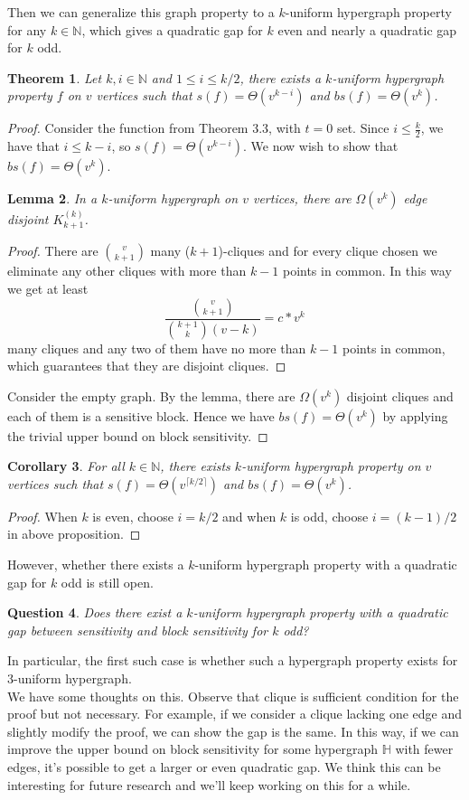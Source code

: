 \documentclass[psamsfonts]{amsart}
\newtheorem{theorem}{Theorem}[section]
\newtheorem{cor}[theorem]{Corollary}
\newtheorem{lem}[theorem]{Lemma}
\newtheorem{quest}[theorem]{Question}
\theoremstyle{definition}
\theoremstyle{remark}
\numberwithin{equation}{section}
\begin{document}
	Then we can generalize this graph property to a $k$-uniform hypergraph property for any $k \in \mathbb{N}$, which gives a quadratic gap for $k$ even and nearly a quadratic gap for $k$ odd.
	\begin{theorem}
		Let $k,i \in \mathbb{N}$ and $1 \leq i \leq k/2$, there exists a $k$-uniform hypergraph property $f$ on $v$ vertices such that $s(f) = \Theta(v^{k-i})$ and $bs(f) = \Theta(v^{k})$.
	\end{theorem}
	\begin{proof}
		Consider the function from Theorem 3.3, with $t=0$ set. Since $i\leq\frac{k}{2}$, we have that $i\leq k-i$, so $s(f)=\Theta(v^{k-i})$. We now wish to show that $bs(f)=\Theta(v^k)$.
		\begin{lem}
			In a $k$-uniform hypergraph on $v$ vertices, there are $\Omega (v^k)$ edge disjoint $K_{k+1}^{(k)}$.
		\end{lem}
		\begin{proof}
			There are $v \choose{k+1}$  many ($k+1$)-cliques and for every clique chosen we eliminate any other cliques with more than $k-1$ points in common. In this way we get at least
		\begin{equation}
			\frac{{v \choose{k+1}}}{{k+1 \choose{k}}(v-k)} = c*v^{k} \nonumber
		\end{equation}		 
		many cliques and any two of them have no more than $k-1$ points in common, which guarantees that they are disjoint cliques.
		\end{proof}
		Consider the empty graph. By the lemma, there are $\Omega (v^k)$ disjoint cliques and each of them is a sensitive block. Hence we have $bs(f) = \Theta (v^k)$ by applying the trivial upper bound on block sensitivity.
	\end{proof}
	
	\begin{cor}
		For all $k \in \mathbb{N}$, there exists $k$-uniform hypergraph property on $v$ vertices such that $s(f) = \Theta(v^{\lceil k/2 \rceil})$ and $bs(f)= \Theta (v^k)$.
	\end{cor}
	\begin{proof}
		When $k$ is even, choose $i=k/2$ and when $k$ is odd, choose $i=(k-1)/2$ in above proposition.
	\end{proof}
	However, whether there exists a $k$-uniform hypergraph property with a quadratic gap for $k$ odd is still open.
	\begin{quest}
		Does there exist a $k$-uniform hypergraph property with a quadratic gap between sensitivity and block sensitivity for $k$ odd? 
	\end{quest}
	In particular, the first such case is whether such a hypergraph property exists for $3$-uniform hypergraph.\\
	\indent We have some thoughts on this. Observe that clique is sufficient condition for the proof but not necessary. For example, if we consider a clique lacking one edge and slightly modify the proof, we can show the gap is the same. In this way, if we can improve the upper bound on block sensitivity for some hypergraph $\mathbb{H}$ with fewer edges, it's possible to get a larger or even quadratic gap. We think this can be interesting for future research and we'll keep working on this for a while.
\end{document}
